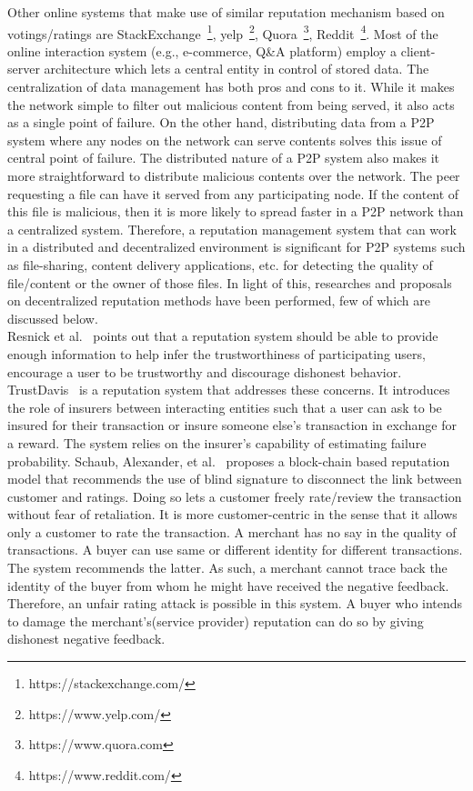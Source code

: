 Other online systems that make use of similar reputation mechanism based on
votings/ratings are StackExchange~\footnote{https://stackexchange.com/},
yelp~\footnote{https://www.yelp.com/}, Quora~\footnote{https://www.quora.com},
Reddit~\footnote{https://www.reddit.com/}. Most of the online interaction
system (e.g., e-commerce, Q\&A platform) employ a client-server architecture
which lets a central entity in control of stored data. The centralization of
data management has both pros and cons to it. While it makes the network simple
to filter out malicious content from being served, it also acts as a single
point of failure. On the other hand, distributing data from a P2P system where
any nodes on the network can serve contents solves this issue of central point
of failure. The distributed nature of a P2P system also makes it more
straightforward to distribute malicious contents over the network. The peer
requesting a file can have it served from any participating node. If the
content of this file is malicious, then it is more likely to spread faster in a
P2P network than a centralized system. Therefore, a reputation management
system that can work in a distributed and decentralized environment is
significant for P2P systems such as file-sharing, content delivery
applications, etc. for detecting the quality of file/content or the owner of
those files. In light of this, researches and proposals on decentralized
reputation methods have been performed, few of which are discussed below.\\ 

Resnick et al.~\cite{resnick2000reputation} points out that a reputation system
should be able to provide enough information to help infer the trustworthiness
of participating users, encourage a user to be trustworthy and discourage
dishonest behavior. TrustDavis~\cite{defigueiredo2005trustdavis} is a
reputation system that addresses these concerns. It introduces the role of
insurers between interacting entities such that a user can ask to be insured
for their transaction or insure someone else's transaction in exchange for a
reward. The system relies on the insurer's capability of estimating failure
probability. Schaub, Alexander, et al.~\cite{schaub2016trustless} proposes a
block-chain based reputation model that recommends the use of blind signature
to disconnect the link between customer and ratings. Doing so lets a customer
freely rate/review the transaction without fear of retaliation. It is more
customer-centric in the sense that it allows only a customer to rate the
transaction. A merchant has no say in the quality of transactions. A buyer can
use same or different identity for different transactions. The system
recommends the latter. As such, a merchant cannot trace back the identity of
the buyer from whom he might have received the negative feedback. Therefore, an
unfair rating attack is possible in this system. A buyer who intends to damage
the merchant's(service provider) reputation can do so by giving dishonest
negative feedback. 


